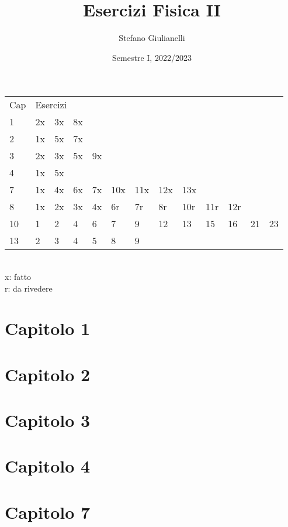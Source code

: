\documentclass[12pt]{article}
\begin{document}
\author{Stefano Giulianelli}
\title{Esercizi Fisica II}
\date{Semestre I, 2022/2023}
\maketitle{}
\tableofcontents{}
\begin{tabular}{ l l l l l l l l l l l l l }
  Cap & \multicolumn{12}{l}{Esercizi}\\
  1 & 2x & 3x & 8x &&&&&&&&&\\
  2 & 1x & 5x & 7x &&&&&&&&&\\
  3 & 2x & 3x & 5x & 9x &&&&&&&&\\
  4 & 1x & 5x &&&&&&&&&&\\
  7 & 1x & 4x & 6x & 7x & 10x & 11x & 12x & 13x &&&&\\
  8 & 1x & 2x & 3x & 4x & 6r & 7r & 8r & 10r & 11r & 12r &&\\
  10 & 1 & 2 & 4 & 6 & 7 & 9 & 12 & 13 & 15 & 16 & 21 & 23 \\
  13 & 2 & 3 & 4 & 5 & 8 & 9 &&&&&& \\
\end{tabular}
\\x: fatto
\\r: da rivedere
\newpage

\section*{Capitolo 1}



\section*{Capitolo 2}



\section*{Capitolo 3}




\section*{Capitolo 4}


\section*{Capitolo 7}








\end{document}
